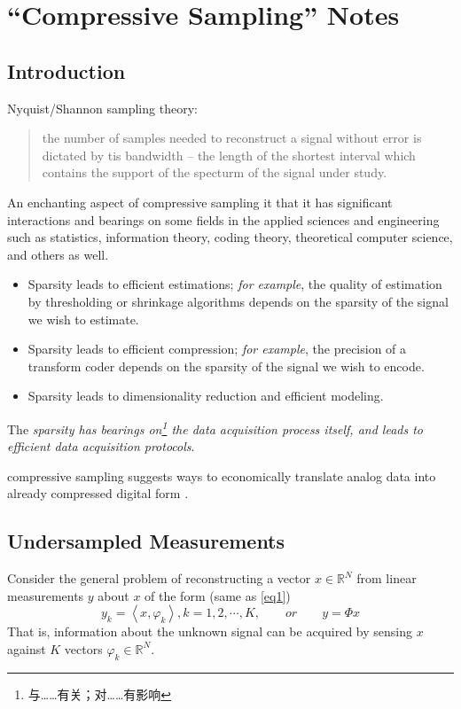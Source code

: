 \chapter{``Compressive Sampling'' Notes}
\section{Introduction}
Nyquist/Shannon sampling theory:
\begin{quote}
	the number of samples needed to reconstruct a signal without error is dictated by tis bandwidth -- the length of the shortest interval which contains the support of the specturm of the signal under study.
\end{quote}
An enchanting aspect of compressive sampling it that it has significant interactions and bearings on some fields in the applied sciences and engineering such as statistics, information theory, coding theory, theoretical computer science, and others as well. 
\begin{itemize}
	\item Sparsity leads to efficient estimations; \emph{for example}, the quality of estimation by thresholding or shrinkage algorithms depends on the sparsity of the signal we wish to estimate.
	\item Sparsity leads to efficient compression; \emph{for example}, the precision of a transform coder depends on the sparsity of the signal we wish to encode\cite{2-24}.
	\item Sparsity leads to dimensionality reduction and efficient modeling.
\end{itemize}
The \emph{sparsity \emph{has bearings on}\footnote{与……有关；对……有影响} the data acquisition process itself, and leads to efficient data acquisition protocols}.

compressive sampling suggests ways to economically translate analog data into already compressed digital form \cite{3,2-7}. 

\section{Undersampled Measurements}
Consider the general problem of reconstructing a vector $x \in \mathbb{R}^N$ from linear measurements $y$ about $x$ of the form (same as \cref{eq1})
\begin{equation}
\label{eq2.1}
y_k=\left<x,\varphi_k\right>, k=1,2,\cdots,K, \qquad or \qquad y=\Phi x
\end{equation}
That is, information about the unknown signal can be acquired by sensing $x$ against $K$ vectors $\varphi_k \in \mathbb{R}^N$. 
